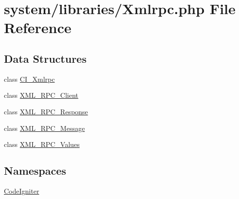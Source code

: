 \hypertarget{_xmlrpc_8php}{}\section{system/libraries/\+Xmlrpc.php File Reference}
\label{_xmlrpc_8php}
\subsection*{Data Structures}
\begin{DoxyCompactItemize}
\item 
class \mbox{\hyperlink{class_c_i___xmlrpc}{C\+I\+\_\+\+Xmlrpc}}
\item 
class \mbox{\hyperlink{class_x_m_l___r_p_c___client}{X\+M\+L\+\_\+\+R\+P\+C\+\_\+\+Client}}
\item 
class \mbox{\hyperlink{class_x_m_l___r_p_c___response}{X\+M\+L\+\_\+\+R\+P\+C\+\_\+\+Response}}
\item 
class \mbox{\hyperlink{class_x_m_l___r_p_c___message}{X\+M\+L\+\_\+\+R\+P\+C\+\_\+\+Message}}
\item 
class \mbox{\hyperlink{class_x_m_l___r_p_c___values}{X\+M\+L\+\_\+\+R\+P\+C\+\_\+\+Values}}
\end{DoxyCompactItemize}
\subsection*{Namespaces}
\begin{DoxyCompactItemize}
\item 
 \mbox{\hyperlink{namespace_code_igniter}{Code\+Igniter}}
\end{DoxyCompactItemize}
